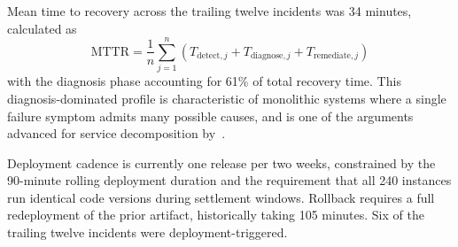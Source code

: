 Mean time to recovery across the trailing twelve incidents was 34 minutes, calculated as
\begin{equation}
\label{eq:mttr-calculation}
\text{MTTR} = \frac{1}{n}\sum_{j=1}^{n} \left(T_{\text{detect},j} + T_{\text{diagnose},j} + T_{\text{remediate},j}\right)
\end{equation}
with the diagnosis phase accounting for 61\% of total recovery time. This diagnosis-dominated profile is characteristic of monolithic systems where a single failure symptom admits many possible causes, and is one of the arguments advanced for service decomposition by~\cite{newman-monolith-to-microservices-2019}.

Deployment cadence is currently one release per two weeks, constrained by the 90-minute rolling deployment duration and the requirement that all 240 instances run identical code versions during settlement windows. Rollback requires a full redeployment of the prior artifact, historically taking 105 minutes. Six of the trailing twelve incidents were deployment-triggered.
